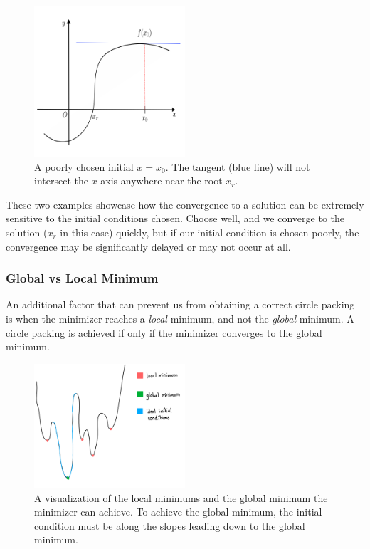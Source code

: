 \begin{figure}[htbp]
    \centering
    \includegraphics[width = 0.5\textwidth]{Chapter 4/10. bad newton raphson.png}
    \caption{A poorly chosen initial $x=x_0$. The tangent (blue line) will not intersect the $x$-axis anywhere near the root $x_r$.}
    \label{fig: bad newton}
\end{figure}

\vspace{-4mm}
\begin{flushleft}
These two examples showcase how the convergence to a solution can be extremely sensitive to the initial conditions chosen. Choose well, and we converge to the solution ($x_r$ in this case) quickly, but if our initial condition is chosen poorly, the convergence may be significantly delayed or may not occur at all.
\end{flushleft}

\subsubsection{Global vs Local Minimum}

\begin{flushleft}
An additional factor that can prevent us from obtaining a correct circle packing is when the minimizer reaches a \textit{local} minimum, and not the \textit{global} minimum. A circle packing is achieved if only if the minimizer converges to the global minimum. 
\end{flushleft}

\begin{figure}[htbp]
    \centering
    \includegraphics[width = 0.5\textwidth]{Chapter 4/11. energy.png}
    \caption{A visualization of the local minimums and the global minimum the minimizer can achieve. To achieve the global minimum, the initial condition must be along the slopes leading down to the global minimum.}
    \label{fig4: minimum}
\end{figure}

